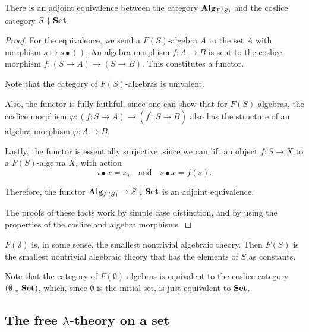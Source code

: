 \begin{lemma}
  There is an adjoint equivalence between the category $ \mathbf{Alg}_{F(S)} $ and the coslice category $ S \downarrow \mathbf{Set} $.
\end{lemma}
\begin{proof}
  For the equivalence, we send a $ F(S) $-algebra $ A $ to the set $ A $ with morphism $ s \mapsto s \bullet () $. An algebra morphism $ f: A \to B $ is sent to the coslice morphism $ f: (S \to A) \to (S \to B) $. This constitutes a functor.

  Note that the category of $ F(S) $-algebras is univalent.

  Also, the functor is fully faithful, since one can show that for $ F(S) $-algebras, the coslice morphism $ \varphi: (f: S \to A) \to (f^\prime: S \to B) $ also has the structure of an algebra morphism $ \varphi: A \to B $.

  Lastly, the functor is essentially surjective, since we can lift an object $ f: S \to X $ to a $ F(S) $-algebra $ X $, with action
  \[ i \bullet x = x_i \quad \text{and} \quad s \bullet x = f(s). \]

  Therefore, the functor $ \mathbf{Alg}_{F(S)} \to S \downarrow \mathbf{Set} $ is an adjoint equivalence.

  The proofs of these facts work by simple case distinction, and by using the properties of the coslice and algebra morphisms.
\end{proof}

\begin{remark}
  $ F(\emptyset) $ is, in some sense, the smallest nontrivial algebraic theory. Then $ F(S) $ is the smallest nontrivial algebraic theory that has the elements of $ S $ as constants.
\end{remark}

\begin{remark}\label{rem:free-theory-algebra-set}
  Note that the category of $ F(\emptyset) $-algebras is equivalent to the coslice-category $ (\emptyset \downarrow \mathbf{Set}) $, which, since $ \emptyset $ is the initial set, is just equivalent to $ \mathbf{Set} $.
\end{remark}

\subsection{The free \texorpdfstring{$ \lambda $}{lambda}-theory on a set}

